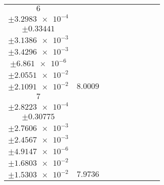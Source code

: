 \documentclass[8pt]{article}
\begin{document}
\begin{longtable}[l]{c c c c c c c c c}
$\num{6}$ & \begin{tabular}[c]{@{}c@{}}$\num{5.6461e-2}$ \\ $\pm\num{3.2983e-4}$\end{tabular} & \begin{tabular}[c]{@{}c@{}}$\num{-0.36076}$ \\ $\pm\num{0.33441}$\end{tabular} & \begin{tabular}[c]{@{}c@{}}$\num{-3.4177}$ \\ $\pm\num{3.1386e-3}$\end{tabular} & \begin{tabular}[c]{@{}c@{}}$\num{2.0711e+3}$ \\ $\pm\num{3.4296e-3}$\end{tabular} & \begin{tabular}[c]{@{}c@{}}$\num{4.1433}$ \\ $\pm\num{6.861e-6}$\end{tabular} & \begin{tabular}[c]{@{}c@{}}$\num{2.9223}$ \\ $\pm\num{2.0551e-2}$\end{tabular} & \begin{tabular}[c]{@{}c@{}}$\num{3.0898}$ \\ $\pm\num{2.1091e-2}$\end{tabular} & $\num{8.0009}$\\
$\num{7}$ & \begin{tabular}[c]{@{}c@{}}$\num{5.3247e-2}$ \\ $\pm\num{2.8223e-4}$\end{tabular} & \begin{tabular}[c]{@{}c@{}}$\num{-0.18953}$ \\ $\pm\num{0.30775}$\end{tabular} & \begin{tabular}[c]{@{}c@{}}$\num{3.4199}$ \\ $\pm\num{2.7606e-3}$\end{tabular} & \begin{tabular}[c]{@{}c@{}}$\num{2.0779e+3}$ \\ $\pm\num{2.4567e-3}$\end{tabular} & \begin{tabular}[c]{@{}c@{}}$\num{4.157}$ \\ $\pm\num{4.9147e-6}$\end{tabular} & \begin{tabular}[c]{@{}c@{}}$\num{2.7235}$ \\ $\pm\num{1.6803e-2}$\end{tabular} & \begin{tabular}[c]{@{}c@{}}$\num{2.4252}$ \\ $\pm\num{1.5303e-2}$\end{tabular} & $\num{7.9736}$\\

\end{longtable}
\end{document}
